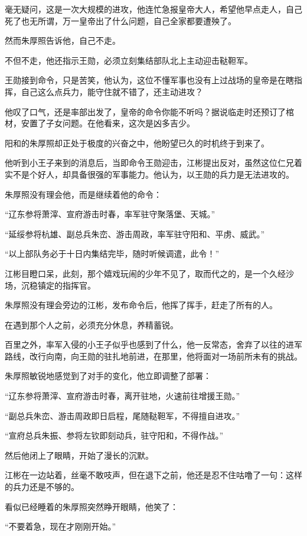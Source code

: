\begin{multicols}{\theparacolNo}
		毫无疑问，这是一次大规模的进攻，他连忙急报皇帝大人，希望他早点走人，自己死了也无所谓，万一皇帝出了什么问题，自己全家都要遭殃了。

		然而朱厚照告诉他，自己不走。

		不但不走，他还指示王勋，必须立刻集结部队北上主动迎击鞑靼军。

		王勋接到命令，只是苦笑，他认为，这位不懂军事也没有上过战场的皇帝是在瞎指挥，自己这么点兵力，能守住就不错了，还主动进攻？

		他叹了口气，还是率部出发了，皇帝的命令你能不听吗？据说临走时还预订了棺材，安置了子女问题。在他看来，这次是凶多吉少。

		阳和的朱厚照却正处于极度的兴奋之中，他盼望已久的时机终于到来了。

		他听到小王子来到的消息后，当即命令王勋迎击，江彬提出反对，虽然这位仁兄着实不是个好人，却具备很强的军事能力。他认为，以王勋的兵力是无法进攻的。

		朱厚照没有理会他，而是继续着他的命令：

		“辽东参将萧滓、宣府游击时春，率军驻守聚落堡、天城。”

		“延绥参将杭雄、副总兵朱峦、游击周政，率军驻守阳和、平虏、威武。”

		“以上部队务必于十日内集结完毕，随时听候调遣，此令！”

		江彬目瞪口呆，此刻，那个嬉戏玩闹的少年不见了，取而代之的，是一个久经沙场，沉稳镇定的指挥官。

		朱厚照没有理会旁边的江彬，发布命令后，他挥了挥手，赶走了所有的人。

		在遇到那个人之前，必须充分休息，养精蓄锐。

		百里之外，率军入侵的小王子似乎也感到了什么，他一反常态，舍弃了以往的进军路线，改行向南，向王勋的驻扎地前进，在那里，他将面对一场前所未有的挑战。

		朱厚照敏锐地感觉到了对手的变化，他立即调整了部署：

		“辽东参将萧滓、宣府游击时春，离开驻地，火速前往增援王勋。”

		“副总兵朱峦、游击周政即日启程，尾随鞑靼军，不得擅自进攻。”

		“宣府总兵朱振、参将左钦即刻动兵，驻守阳和，不得作战。”

		然后他闭上了眼睛，开始了漫长的沉默。

		江彬在一边站着，丝毫不敢吱声，但在退下之前，他还是忍不住咕噜了一句：这样的兵力还是不够的。

		看似已经睡着的朱厚照突然睁开眼睛，他笑了：

		“不要着急，现在才刚刚开始。”


\end{multicols}
